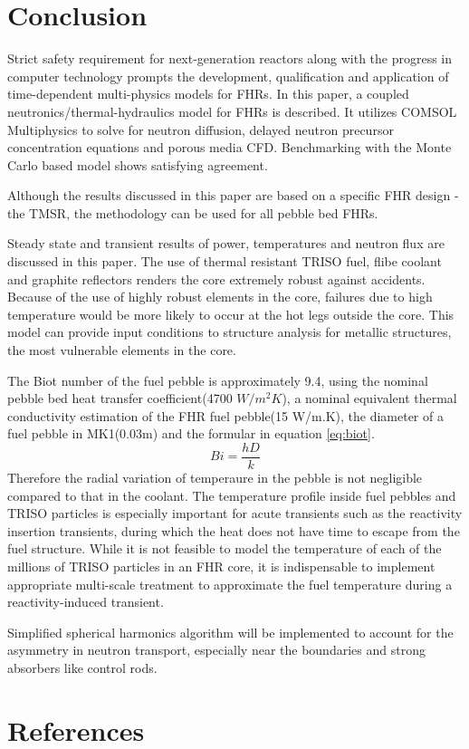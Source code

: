 \documentclass{elsarticle}
\begin{document}
\section{Conclusion}
Strict safety requirement for next-generation reactors along with the progress in computer technology prompts the development, qualification and application of time-dependent multi-physics models for FHRs.
In this paper, a coupled neutronics/thermal-hydraulics model for FHRs is described. It utilizes COMSOL Multiphysics to solve for neutron diffusion, delayed neutron precursor concentration equations and porous media CFD. Benchmarking with the Monte Carlo based model shows satisfying agreement. 

Although the results discussed in this paper are based on a specific FHR design - the TMSR, the methodology can be used for all pebble bed FHRs.

Steady state and transient results of power, temperatures and neutron flux are discussed in this paper. The use of thermal resistant TRISO fuel, flibe coolant and graphite reflectors renders the core extremely robust against accidents. 
Because of the use of highly robust elements in the core, failures due to high temperature would be more likely to occur at the hot legs outside the core.
This model can provide input conditions to structure analysis for metallic structures, the most vulnerable elements in the core. 


The Biot number of the fuel pebble is approximately 9.4, using the nominal pebble bed heat transfer coefficient(4700 $W/m^2K$), a nominal equivalent thermal conductivity estimation of the FHR fuel pebble(15 W/m.K), the diameter of a fuel pebble in MK1(0.03m) and the formular in equation \ref{eq:biot}.
\begin{equation}
    Bi = \frac{hD}{k}
    \label{eq:biot}
\end{equation}
Therefore the radial variation of temperaure in the pebble is not negligible compared to that in the coolant.
The temperature profile inside fuel pebbles and TRISO particles is especially important for acute transients such as the reactivity insertion transients, during which the heat does not have time to escape from the fuel structure. While it is not feasible to model the temperature of each of the millions of TRISO particles in an FHR core, it is indispensable to implement appropriate multi-scale treatment to approximate the fuel temperature during a reactivity-induced transient.

Simplified spherical harmonics algorithm will be implemented to account for the asymmetry in neutron transport, especially near the boundaries and strong absorbers like control rods.


\section*{References}


\end{document}
